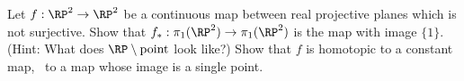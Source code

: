 Let $f:\RP^2\rightarrow \RP^2$ be a continuous map between real
projective planes which is not surjective.  Show that
$f_*:\pi_1(\RP^2)\rightarrow \pi_1(\RP^2)$ is the map with image
$\{1\}$. (Hint: What does $\RP \setminus \mathrm{point}$ look like?)
Show that $f$ is homotopic to a constant map, \ie\ to a map whose
image is a single point.

